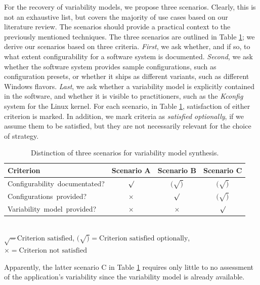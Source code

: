 For the recovery of variability models, we propose three scenarios. Clearly,
this is not an exhaustive list, but covers the majority of use cases based on
our literature review. The scenarios should provide a practical context to the
previously mentioned techniques. The three scenarios are outlined in Table
\ref{tab:synthesis}; we derive our scenarios based on three criteria.
\emph{First}, we ask whether, and if so, to what extent configurability for a
software system is documented. \emph{Second}, we ask whether the software
system provides sample configurations, such as configuration presets, or
whether it ships as different variants, such as different Windows flavors.
\emph{Last}, we ask whether a variability model is explicitly contained in the
software, and whether it is visible to practitioners, such as the \emph{Kconfig}
system for the Linux kernel. For each scenario, in Table \ref{tab:synthesis},
satisfaction of either criterion is marked. In addition, we mark criteria as
\emph{satisfied optionally}, if we assume them to be satisfied, but they are
not necessarily relevant for the choice of strategy.

\begin{table} 
	\centering
	\begin{tabular}{lccc}%
	\toprule
	\textbf{Criterion} & \textbf{Scenario A} & \textbf{Scenario B} &
	\textbf{Scenario C}
	\\
	\midrule
	\mbox{Configurability documentated?} & $\surd$ & $(\surd)$ & $(\surd)$ \\
	\mbox{Configurations provided?} & $\times$ & $\surd$ & $(\surd)$ \\
	\mbox{Variability model provided?} & $\times$ & $\times$ & $\surd$ \\
	\bottomrule
	\end{tabular}\\
	\vspace{1mm}
	{\footnotesize $\surd = \text{Criterion satisfied}$, $(\surd) =
	\text{Criterion satisfied optionally}$, $\times = \text{Criterion not
	satisfied}$}
	\caption{Distinction of three scenarios for variability model synthesis. }
	\label{tab:synthesis}
\end{table}

Apparently, the latter scenario C in Table \ref{tab:synthesis} requires only
little to no assessment of the application's variability since the variability
model is already available.

